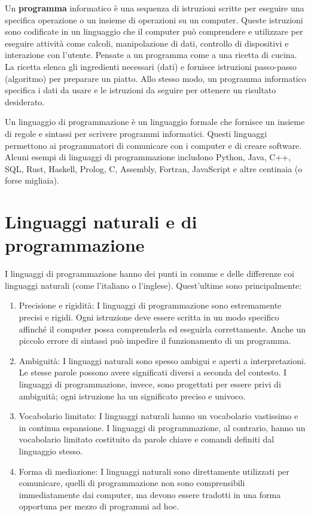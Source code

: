 \documentclass[
  letterpaper,
]{scrbook}
\begin{document}
Un \textbf{programma} informatico è una sequenza di istruzioni scritte
per eseguire una specifica operazione o un insieme di operazioni su un
computer. Queste istruzioni sono codificate in un linguaggio che il
computer può comprendere e utilizzare per eseguire attività come
calcoli, manipolazione di dati, controllo di dispositivi e interazione
con l'utente. Pensate a un programma come a una ricetta di cucina. La
ricetta elenca gli ingredienti necessari (dati) e fornisce istruzioni
passo-passo (algoritmo) per preparare un piatto. Allo stesso modo, un
programma informatico specifica i dati da usare e le istruzioni da
seguire per ottenere un risultato desiderato.

Un linguaggio di programmazione è un linguaggio formale che fornisce un
insieme di regole e sintassi per scrivere programmi informatici. Questi
linguaggi permettono ai programmatori di comunicare con i computer e di
creare software. Alcuni esempi di linguaggi di programmazione includono
Python, Java, C++, SQL, Rust, Haskell, Prolog, C, Assembly, Fortran,
JavaScript e altre centinaia (o forse migliaia).

\section{Linguaggi naturali e di
programmazione}\label{linguaggi-naturali-e-di-programmazione}

I linguaggi di programmazione hanno dei punti in comune e delle
differenze coi linguaggi naturali (come l'italiano o l'inglese).
Quest'ultime sono principalmente:

\begin{enumerate}
\def\labelenumi{\arabic{enumi}.}
\item
  Precisione e rigidità: I linguaggi di programmazione sono estremamente
  precisi e rigidi. Ogni istruzione deve essere scritta in un modo
  specifico affinché il computer possa comprenderla ed eseguirla
  correttamente. Anche un piccolo errore di sintassi può impedire il
  funzionamento di un programma.
\item
  Ambiguità: I linguaggi naturali sono spesso ambigui e aperti a
  interpretazioni. Le stesse parole possono avere significati diversi a
  seconda del contesto. I linguaggi di programmazione, invece, sono
  progettati per essere privi di ambiguità; ogni istruzione ha un
  significato preciso e univoco.
\item
  Vocabolario limitato: I linguaggi naturali hanno un vocabolario
  vastissimo e in continua espansione. I linguaggi di programmazione, al
  contrario, hanno un vocabolario limitato costituito da parole chiave e
  comandi definiti dal linguaggio stesso.
\item
  Forma di mediazione: I linguaggi naturali sono direttamente utilizzati
  per comunicare, quelli di programmazione non sono comprensibili
  immediatamente dai computer, ma devono essere tradotti in una forma
  opportuna per mezzo di programmi ad hoc.
\end{enumerate}
\end{document}

